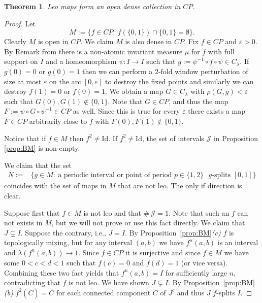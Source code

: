 \documentclass[12pt, a4paper]{amsart}
\newtheorem{theorem}{Theorem}[section]
\def\eps{\varepsilon}
\def\J{{\mathcal J}}
\newcommand{\?}{{\bf ???}}
\begin{document}
\begin{theorem}\label{thm:leo} Leo maps form an open dense collection in $CP$.
\end{theorem}

\begin{proof}Let 
\begin{equation*}
M :=\{f\in CP\colon~f(\{0,1\})\cap \{0,1\}=\emptyset\}.
\end{equation*}
Clearly $M$ is open in $CP$.  We claim $M$ is also dense in $CP$. Fix $f\in CP$ and $\eps > 0$. By Remark from \cite{BCOT} there is a non-atomic invariant measure $\mu$ for $f$ with full support on $I$ and a homeomorphism $\psi:I\to I$ such that $g:=\psi^{-1}\circ f\circ \psi\in C_{\lambda}$. If $g(0)=0$ or $g(0)=1$ then we can perform a $2$-fold window perturbation of size at most $\eps$ on the arc $[0,\eps]$ to destroy the fixed points and similarly we can destroy $f(1)=0$ or $f(0)=1$. We obtain a map $G\in C_{\lambda}$ with $\rho(G,g) < \eps$ such that $G(0),G(1)\notin \{0,1\}$. Note that $G \in CP$, and thus the map
$F:=\psi\circ G\circ \psi^{-1}\in CP$ as well. 
Since this is true for every $\eps$ there exists a map $F \in CP$ arbitrarily close to $f$ with $F(0),F(1)\notin \{0,1\}$.

  Notice that if $f \in M$ then $f^2\ne\mathrm{Id}$. 
	If $f^2\ne \mathrm{Id}$, the set of intervals $\J$ in Proposition \ref{prop:BM} is non-empty.

We claim that the set
\begin{align*}N:=&\{g\in M\colon~\text{a periodic interval or point of period $p\in\{1,2\}$ $g$-splits }[0,1] \}
\end{align*}
coincides with the set of maps in $M$ that are not leo. 
The only if direction is clear.

 Suppose first that $f \in M$ is not leo and that 
$\#\, \J =1$. Note that such an $f$ can not exists in $M$, but we will not prove or use this fact directly. We claim that  
$J \subsetneq I$. Suppose the contrary, i.e., $J = I$.  By Proposition~\ref{prop:BM}{\it (c)} $f$ is topologically mixing, but for any interval $(a,b)$ we have
$f^n(a,b)$ is an interval and $\lambda(f^n(a,b)) \to 1$.  Since $f \in CP$ it is surjective and since 
$f \in M$ we have some $0<c<d<1$ such that $f(c) = 0$ and $f(d) =1$ (or vice versa). Combining these two fact yields that $f^n(a,b) = I$ for sufficiently large $n$, contradicting that $f$ is not leo.  We have shown $J \subsetneq I.$
By Proposition~\ref{prop:BM}{\it (b)} $f^2(\overline{C}) = \overline{C}$ for each connected component $C$ of $J^c$ and thus $J$ $f$-splits $I$.


\end{proof}
\end{document}
